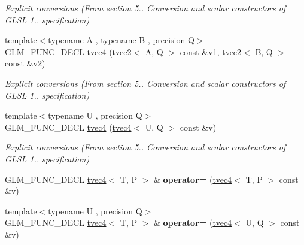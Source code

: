 \begin{DoxyCompactItemize}
\begin{DoxyCompactList}\small\item\em Explicit conversions (From section 5.. Conversion and scalar constructors of G\-L\-S\-L 1.. specification) \end{DoxyCompactList}\item 
\hypertarget{structglm_1_1detail_1_1tvec4_a1aa94df5eda41024d31fb335a3a14026}{{\footnotesize template$<$typename A , typename B , precision Q$>$ }\\G\-L\-M\-\_\-\-F\-U\-N\-C\-\_\-\-D\-E\-C\-L \hyperlink{structglm_1_1detail_1_1tvec4_a1aa94df5eda41024d31fb335a3a14026}{tvec4} (\hyperlink{structglm_1_1detail_1_1tvec2}{tvec2}$<$ A, Q $>$ const \&v1, \hyperlink{structglm_1_1detail_1_1tvec2}{tvec2}$<$ B, Q $>$ const \&v2)}\label{structglm_1_1detail_1_1tvec4_a1aa94df5eda41024d31fb335a3a14026}

\begin{DoxyCompactList}\small\item\em Explicit conversions (From section 5.. Conversion and scalar constructors of G\-L\-S\-L 1.. specification) \end{DoxyCompactList}\item 
\hypertarget{structglm_1_1detail_1_1tvec4_ad57045d32f9c47a4afbb3d7524fe24ee}{{\footnotesize template$<$typename U , precision Q$>$ }\\G\-L\-M\-\_\-\-F\-U\-N\-C\-\_\-\-D\-E\-C\-L \hyperlink{structglm_1_1detail_1_1tvec4_ad57045d32f9c47a4afbb3d7524fe24ee}{tvec4} (\hyperlink{structglm_1_1detail_1_1tvec4}{tvec4}$<$ U, Q $>$ const \&v)}\label{structglm_1_1detail_1_1tvec4_ad57045d32f9c47a4afbb3d7524fe24ee}

\begin{DoxyCompactList}\small\item\em Explicit conversions (From section 5.. Conversion and scalar constructors of G\-L\-S\-L 1.. specification) \end{DoxyCompactList}\item 
\hypertarget{structglm_1_1detail_1_1tvec4_abafc0f4531b7d93b50e63bcdf9bcbf97}{G\-L\-M\-\_\-\-F\-U\-N\-C\-\_\-\-D\-E\-C\-L \hyperlink{structglm_1_1detail_1_1tvec4}{tvec4}$<$ T, P $>$ \& {\bfseries operator=} (\hyperlink{structglm_1_1detail_1_1tvec4}{tvec4}$<$ T, P $>$ const \&v)}\label{structglm_1_1detail_1_1tvec4_abafc0f4531b7d93b50e63bcdf9bcbf97}

\item 
\hypertarget{structglm_1_1detail_1_1tvec4_a9fc0189acf6230da54693f07ff80d4e7}{{\footnotesize template$<$typename U , precision Q$>$ }\\G\-L\-M\-\_\-\-F\-U\-N\-C\-\_\-\-D\-E\-C\-L \hyperlink{structglm_1_1detail_1_1tvec4}{tvec4}$<$ T, P $>$ \& {\bfseries operator=} (\hyperlink{structglm_1_1detail_1_1tvec4}{tvec4}$<$ U, Q $>$ const \&v)}\label{structglm_1_1detail_1_1tvec4_a9fc0189acf6230da54693f07ff80d4e7}


\end{DoxyCompactItemize}
